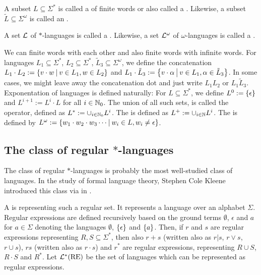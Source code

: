 A subset $L \subseteq \Sigma^*$ is called a  of finite words or also called a . Likewise, a subset $\tilde L \subseteq \Sigma^\omega$ is called an .

A set $\mathcal{L}$ of $*$-languages is called a . Likewise, a set $\mathcal{L}^\omega$ of $\omega$-languages is called a .

We can  finite words with each other and also finite words with infinite words. For languages $L_1 \subseteq \Sigma^*$, $L_2 \subseteq \Sigma^*$, $\tilde L_3 \subseteq \Sigma^\omega$, we define the concatenation $L_1 \cdot L_2 := \Set{v \cdot w}{v \in L_1, w \in L_2}$ and $L_1 \cdot \tilde L_3 := \Set{v \cdot \alpha}{v \in L_1, \alpha \in \tilde L_3}$. In some cases, we might leave away the concatenation dot and just write $L_1 L_2$ or $L_1 \tilde L_3$. Exponentation of languages is defined naturally: For $L \subseteq \Sigma^*$, we define $L^0 := \Set{\epsilon}$ and $L^{i+1} := L^i \cdot L$ for all $i \in \mathbb{N}_0$. The union of all such sets, is called the  operator, defined as $L^* := \cup_{i\in\mathbb{N}_0} L^i$. The  is defined as $L^+ := \cup_{i\in\mathbb{N}} L^i$. The  is defined by $L^\omega := \Set{w_1 \cdot w_2 \cdot w_3 \cdots}{w_i \in L, w_i \ne \epsilon}$.

\subsection{The class of regular $*$-languages}
\label{intro:reglang}

The class of regular $*$-languages is probably the most well-studied class of languages. In the study of formal language theory, Stephen Cole Kleene introduced this class via  in \cite{Kleene56}.

A  is representing such a regular set. It represents a language over an alphabet $\Sigma$. Regular expressions are defined recursively based on the ground terms $\emptyset$, $\epsilon$ and $a$ for $a \in \Sigma$ denoting the languages $\emptyset$, $\Set{\epsilon}$ and $\Set{a}$. Then, if $r$ and $s$ are regular expressions representing $R, S \subseteq \Sigma^*$, then also $r+s$ (written also as $r|s$, $r \vee s$, $r \cup s$), $r s$ (written also as $r \cdot s$) and $r^*$ are regular expressions, representing $R \cup S$, $R \cdot S$ and $R^*$. Let $\mathcal{L}^*(\text{RE})$ be the set of languages which can be represented as regular expressions.

